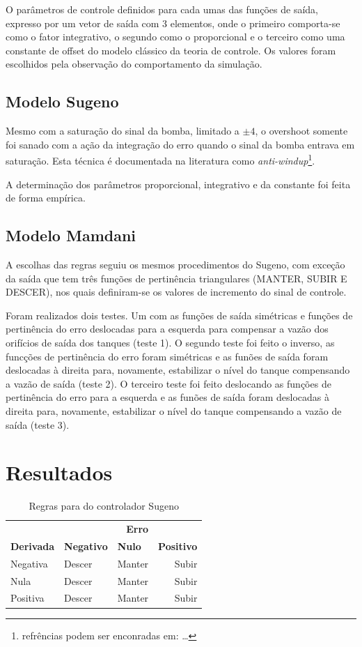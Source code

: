 \documentclass[
	twoside,				%
	twocolumn,				%
	english,				%
	brazil,					%
]{article}
\begin{document}
O parâmetros de controle definidos para cada umas das funções de saída, expresso por um vetor de saída com 3 elementos, onde o primeiro comporta-se como o fator integrativo, o segundo como o proporcional e o terceiro como uma constante de offset do modelo clássico da teoria de controle. Os valores foram escolhidos pela observação do comportamento da simulação.

\subsection{Modelo Sugeno}

Mesmo com a saturação do sinal da bomba, limitado a $\pm4$, o overshoot somente foi sanado com a ação da integração do erro quando o sinal da bomba entrava em saturação. Esta técnica é documentada na literatura como \textit{anti-windup}\footnote{refrências podem ser enconradas em: \ldots}.

A determinação dos parâmetros proporcional, integrativo e da constante foi feita de forma empírica.

\subsection{Modelo Mamdani}

A escolhas das regras seguiu os mesmos procedimentos do Sugeno, com exceção da saída que tem três funções de pertinência triangulares (MANTER, SUBIR E DESCER), nos quais definiram-se os valores de incremento do sinal de controle.

Foram realizados dois testes. Um com as funções de saída simétricas e funções de pertinência do erro deslocadas para a esquerda para compensar a vazão dos orifícios de saída dos tanques (teste 1). O segundo teste foi feito o inverso, as funcções de pertinência do erro foram simétricas e as funões de saída foram deslocadas à direita para, novamente, estabilizar o nível do tanque compensando a vazão de saída (teste 2). O terceiro teste foi feito deslocando as funções de pertinência do erro para a esquerda e as funões de saída foram deslocadas à direita para, novamente, estabilizar o nível do tanque compensando a vazão de saída (teste 3).

\section{Resultados}

\begin{table}
\caption{Regras para do controlador Sugeno}
\centering
\begin{tabular}{lllr}
\toprule
\multicolumn{3}{r}{\textbf{Erro}} \\
\cmidrule(r){2-4}
\textbf{Derivada} & \textbf{Negativo} & \textbf{Nulo} & \textbf{Positivo} \\
Negativa & Descer & Manter & Subir \\
Nula & Descer & Manter & Subir \\
Positiva & Descer & Manter & Subir \\
\bottomrule
\end{tabular}
\end{table}
\end{document}

